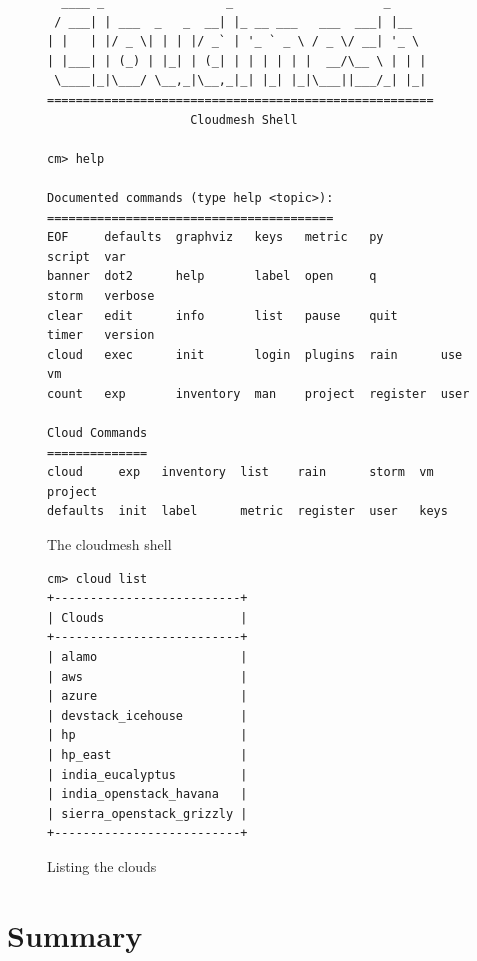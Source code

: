 \documentclass[graybox]{svmult}
\begin{document}
\begin{figure}[htb]
\begingroup
   \fontsize{6pt}{6pt}\selectfont
\begin{verbatim}
  ____ _                 _                     _     
 / ___| | ___  _   _  __| |_ __ ___   ___  ___| |__  
| |   | |/ _ \| | | |/ _` | '_ ` _ \ / _ \/ __| '_ \ 
| |___| | (_) | |_| | (_| | | | | | |  __/\__ \ | | |
 \____|_|\___/ \__,_|\__,_|_| |_| |_|\___||___/_| |_|
======================================================
                    Cloudmesh Shell

cm> help

Documented commands (type help <topic>):
========================================
EOF     defaults  graphviz   keys   metric   py        script  var    
banner  dot2      help       label  open     q         storm   verbose
clear   edit      info       list   pause    quit      timer   version
cloud   exec      init       login  plugins  rain      use     vm     
count   exp       inventory  man    project  register  user  

Cloud Commands
==============
cloud     exp   inventory  list    rain      storm  vm    project
defaults  init  label      metric  register  user   keys
\end{verbatim}
\endgroup
\caption{The cloudmesh shell}
\label{F:shell}
\end{figure}

\begin{figure}[htb]
\begingroup
   \fontsize{6pt}{6pt}\selectfont
\begin{verbatim}
cm> cloud list
+--------------------------+
| Clouds                   |
+--------------------------+
| alamo                    |
| aws                      |
| azure                    |
| devstack_icehouse        |
| hp                       |
| hp_east                  |
| india_eucalyptus         |
| india_openstack_havana   |
| sierra_openstack_grizzly |
+--------------------------+
\end{verbatim}
\endgroup
\caption{Listing the clouds}
\label{F:shell-clouds}
\end{figure}

\afterpage{\clearpage}

\section{Summary}\label{S:summary}
\end{document}
